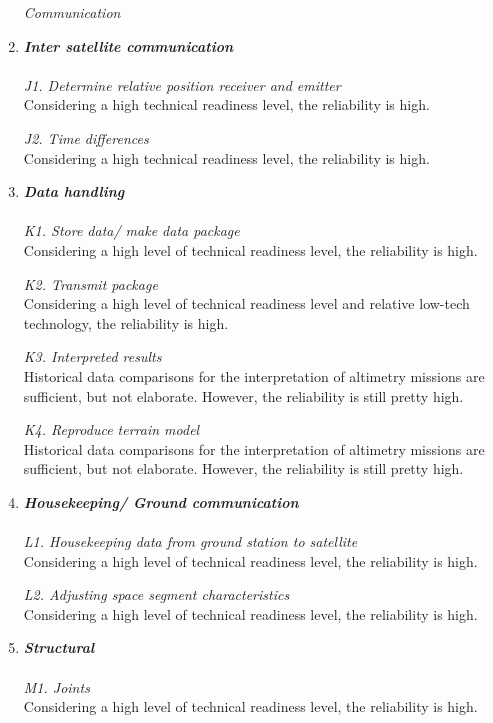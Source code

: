 \begin{enumerate}[A]
\begin{description}
\item[\textit{Communication}]
\end{description}
	\item\textbf{\textit{Inter satellite communication}} \\\\
\textit{J1. Determine relative position receiver and emitter}\\ 
Considering a high technical readiness level, the reliability is high.

\textit{J2. Time differences}\\ 
Considering a high technical readiness level, the reliability is high.

	\item\textbf{\textit{Data handling}} \\\\
\textit{K1. Store data/ make data package}\\ 
Considering a high level of technical readiness level, the reliability is high.

\textit{K2. Transmit package}\\ 
Considering a high level of technical readiness level and relative low-tech technology, the reliability is high.

\textit{K3. Interpreted results}\\ 
Historical data comparisons for the interpretation of altimetry missions are sufficient, but not elaborate. However, the reliability is still pretty high.

\textit{K4. Reproduce terrain model}\\
Historical data comparisons for the interpretation of altimetry missions are sufficient, but not elaborate. However, the reliability is still pretty high.
 
	\item\textbf{\textit{Housekeeping/ Ground communication}} \\\\
\textit{L1. Housekeeping data from ground station to satellite}\\ 
Considering a high level of technical readiness level, the reliability is high.

\textit{L2. Adjusting space segment characteristics}\\ 
Considering a high level of technical readiness level, the reliability is high.

	\item\textbf{\textit{Structural}} \\\\
\textit{M1. Joints}\\ 
Considering a high level of technical readiness level, the reliability is high.


\end{enumerate}

